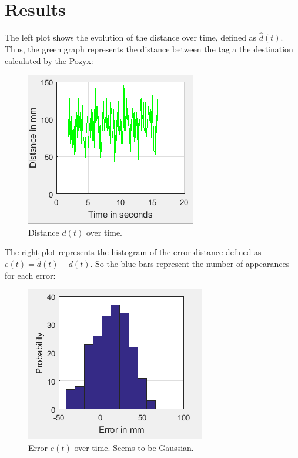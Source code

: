 \documentclass[a4paper, 21pt]{article} %
\begin{document}

\section{Results}\label{se:results}
The left plot shows the evolution of the distance over time, defined as $\hat{d}(t)$. Thus, the green graph represents the distance between the tag a the destination calculated by the Pozyx:
\begin{figure}[H]
\begin{center}
\includegraphics[scale=.8]{fig/d.png}
\end{center}
\caption{Distance $d(t)$ over time.}
\end{figure}

The right plot represents the histogram of the error distance defined as $e(t) = \hat{d}(t)-d(t)$. So the blue bars represent the number of appearances for each error:
\begin{figure}[H]
\begin{center}
\includegraphics[scale=.9]{fig/e.png}
\end{center}
\caption{Error $e(t)$ over time. Seems to be Gaussian.}
\end{figure}
\end{document}
